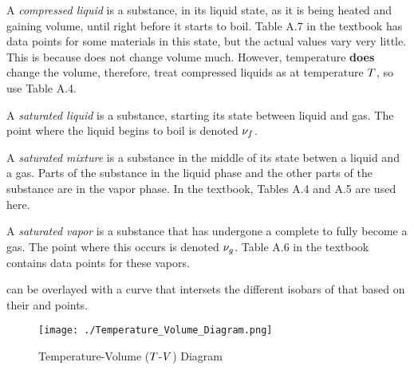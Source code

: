 \begin{definition}\label{def:Compressed_Liquid}
  A \emph{compressed liquid} is a substance, in its liquid state, as it is being heated and gaining volume, until right before it starts to boil.
  Table A.7 in the textbook has data points for some materials in this state, but the actual values vary very little.
  This is because  does not change volume much.
  However, temperature \textbf{does} change the volume, therefore, treat compressed liquids as  at temperature $T$, so use Table A.4.
\end{definition}

\begin{definition}\label{def:Saturated_Liquid}
  A \emph{saturated liquid} is a substance, starting its  state between liquid and gas.
  The point where the liquid begins to boil is denoted $\nu_{f}$.
\end{definition}

\begin{definition}\label{def:Saturated_Mixture}
  A \emph{saturated mixture} is a substance in the middle of its  state betwen a liquid and a gas.
  Parts of the substance in the liquid phase and the other parts of the substance are in the vapor phase.
  In the textbook, Tables A.4 and A.5 are used here.
\end{definition}

\begin{definition}\label{def:Saturated_Vapor}
  A \emph{saturated vapor} is a substance that has undergone a complete  to fully become a gas.
  The point where this occurs is denoted $\nu_{g}$.
  Table A.6 in the textbook contains data points for these vapors.
\end{definition}

 can be overlayed with a curve that intersets the different isobars of that  based on their  and  points.

\begin{figure}[h!tbp]
  \centering
  \texttt{[image: ./Temperature\_Volume\_Diagram.png]}
  \caption{Temperature-Volume ($T$-$V$) Diagram}
  \label{fig:Temperature_Pressure_Diagram}
\end{figure}

